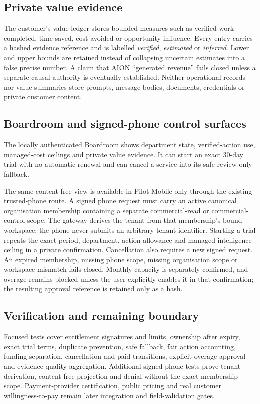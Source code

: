 \subsection{Private value evidence}

The customer's value ledger stores bounded measures such as verified work completed, time saved,
cost avoided or opportunity influence.  Every entry carries a hashed evidence reference and is
labelled \emph{verified}, \emph{estimated} or \emph{inferred}.  Lower and upper bounds are retained
instead of collapsing uncertain estimates into a false precise number.  A claim that AION
``generated revenue'' fails closed unless a separate causal authority is eventually established.
Neither operational records nor value summaries store prompts, message bodies, documents,
credentials or private customer content.

\subsection{Boardroom and signed-phone control surfaces}

The locally authenticated Boardroom shows department state, verified-action use, managed-cost
ceilings and private value evidence.  It can start an exact 30-day trial with no automatic renewal
and can cancel a service into its safe review-only fallback.

The same content-free view is available in Pilot Mobile only through the existing trusted-phone
route.  A signed phone request must carry an active canonical organisation membership containing a
separate commercial-read or commercial-control scope.  The gateway derives the tenant from that
membership's bound workspace; the phone never submits an arbitrary tenant identifier.  Starting a
trial repeats the exact period, department, action allowance and managed-intelligence ceiling in a
private confirmation.  Cancellation also requires a new signed request.  An expired membership,
missing phone scope, missing organisation scope or workspace mismatch fails closed.
Monthly capacity is separately confirmed, and overage remains blocked unless the user explicitly
enables it in that confirmation; the resulting approval reference is retained only as a hash.

\subsection{Verification and remaining boundary}

Focused tests cover entitlement signatures and limits, ownership after expiry, exact trial
terms, duplicate prevention, safe fallback, fair action accounting, funding separation,
cancellation and paid transitions, explicit overage approval and evidence-quality aggregation.
Additional signed-phone tests prove tenant derivation, content-free projection and denial without
the exact membership scope.  Payment-provider certification, public pricing and real customer
willingness-to-pay remain later integration and field-validation gates.
